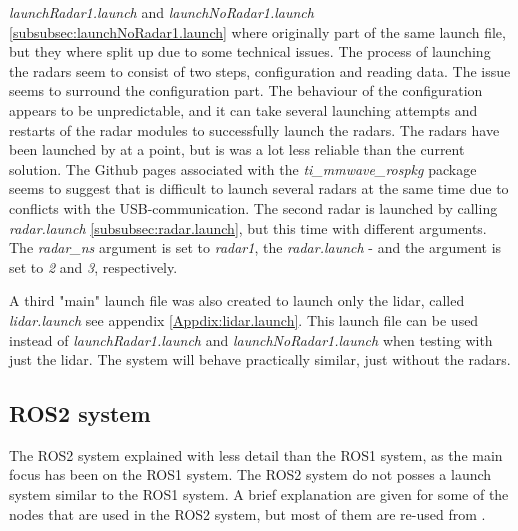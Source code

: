 \label{subsubsec:launchRadar1.launch}
\textit{launchRadar1.launch} and \textit{launchNoRadar1.launch} \ref{subsubsec:launchNoRadar1.launch} where originally part of the same launch file, but they where split up due to some technical issues. The process of launching the radars seem to consist of two steps, configuration and reading data. The issue seems to surround the configuration part. The behaviour of the configuration appears to be unpredictable, and it can take several launching attempts and restarts of the radar modules to successfully launch the radars. The radars have been launched by at a point, but is was a lot less reliable than the current solution. The Github pages associated with the \textit{ti\_mmwave\_rospkg} package seems to suggest that is difficult to launch several radars at the same time due to conflicts with the USB-communication. The second radar is launched by calling \textit{radar.launch} \ref{subsubsec:radar.launch}, but this time with different arguments. The \textit{radar\_ns} argument is set to \textit{radar1}, the \textit{radar.launch} - and the argument is set to \textit{2} and \textit{3}, respectively. 

\label{subsubsec:lidar.launch}
A third "main" launch file was also created to launch only the lidar, called \textit{lidar.launch} see appendix \ref{Appdix:lidar.launch}. This launch file can be used instead of \textit{launchRadar1.launch} and \textit{launchNoRadar1.launch} when testing with just the lidar. The system will behave practically similar, just without the radars.

\subsection{ROS2 system}
The ROS2 system explained with less detail than the ROS1 system, as the main focus has been on the ROS1 system. The ROS2 system do not posses a launch system similar to the ROS1 system. A brief explanation are given for some of the nodes that are used in the ROS2 system, but most of them are re-used from \cite{uia_husky_0776}. 

